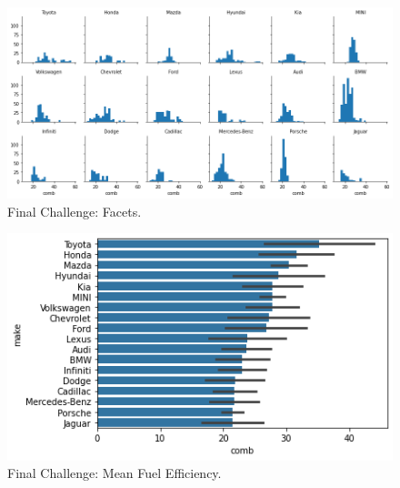 \begin{figure}
	\includegraphics[width=\textwidth,height=\textheight,keepaspectratio]{images/figure27.png}
	\caption{Final Challenge: Facets.}\label{fig:figure27}
\end{figure}

\begin{figure}
	\includegraphics{images/figure28.png}
	\caption{Final Challenge: Mean Fuel Efficiency.}\label{fig:figure28}
\end{figure}